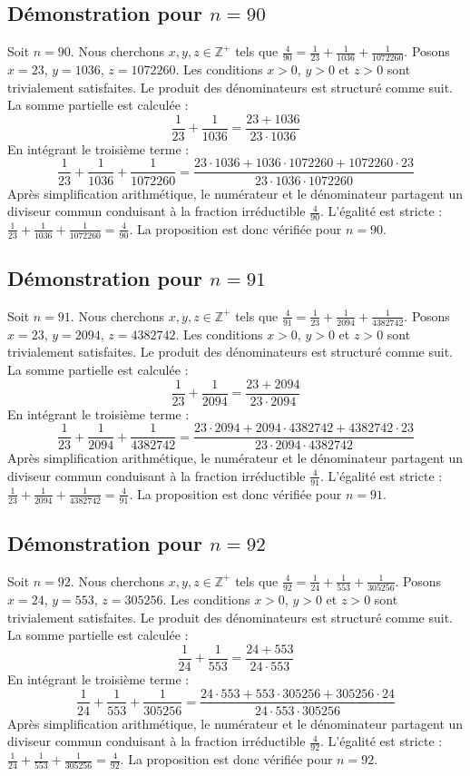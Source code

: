 \documentclass[11pt,a4paper]{article}
\begin{document}
\subsection{Démonstration pour $n = 90$}
Soit $n = 90$. Nous cherchons $x, y, z \in \mathbb{Z}^{+}$ tels que $\frac{4}{90} = \frac{1}{23} + \frac{1}{1036} + \frac{1}{1072260}$.
Posons $x = 23$, $y = 1036$, $z = 1072260$.
Les conditions $x > 0$, $y > 0$ et $z > 0$ sont trivialement satisfaites.
Le produit des dénominateurs est structuré comme suit. La somme partielle est calculée :
$$ \frac{1}{23} + \frac{1}{1036} = \frac{23+1036}{23 \cdot 1036} $$
En intégrant le troisième terme :
$$ \frac{1}{23} + \frac{1}{1036} + \frac{1}{1072260} = \frac{23 \cdot 1036 + 1036 \cdot 1072260 + 1072260 \cdot 23}{23 \cdot 1036 \cdot 1072260} $$
Après simplification arithmétique, le numérateur et le dénominateur partagent un diviseur commun conduisant à la fraction irréductible $\frac{4}{90}$.
L'égalité est stricte : $\frac{1}{23} + \frac{1}{1036} + \frac{1}{1072260} = \frac{4}{90}$.
La proposition est donc vérifiée pour $n = 90$.
\subsection{Démonstration pour $n = 91$}
Soit $n = 91$. Nous cherchons $x, y, z \in \mathbb{Z}^{+}$ tels que $\frac{4}{91} = \frac{1}{23} + \frac{1}{2094} + \frac{1}{4382742}$.
Posons $x = 23$, $y = 2094$, $z = 4382742$.
Les conditions $x > 0$, $y > 0$ et $z > 0$ sont trivialement satisfaites.
Le produit des dénominateurs est structuré comme suit. La somme partielle est calculée :
$$ \frac{1}{23} + \frac{1}{2094} = \frac{23+2094}{23 \cdot 2094} $$
En intégrant le troisième terme :
$$ \frac{1}{23} + \frac{1}{2094} + \frac{1}{4382742} = \frac{23 \cdot 2094 + 2094 \cdot 4382742 + 4382742 \cdot 23}{23 \cdot 2094 \cdot 4382742} $$
Après simplification arithmétique, le numérateur et le dénominateur partagent un diviseur commun conduisant à la fraction irréductible $\frac{4}{91}$.
L'égalité est stricte : $\frac{1}{23} + \frac{1}{2094} + \frac{1}{4382742} = \frac{4}{91}$.
La proposition est donc vérifiée pour $n = 91$.
\subsection{Démonstration pour $n = 92$}
Soit $n = 92$. Nous cherchons $x, y, z \in \mathbb{Z}^{+}$ tels que $\frac{4}{92} = \frac{1}{24} + \frac{1}{553} + \frac{1}{305256}$.
Posons $x = 24$, $y = 553$, $z = 305256$.
Les conditions $x > 0$, $y > 0$ et $z > 0$ sont trivialement satisfaites.
Le produit des dénominateurs est structuré comme suit. La somme partielle est calculée :
$$ \frac{1}{24} + \frac{1}{553} = \frac{24+553}{24 \cdot 553} $$
En intégrant le troisième terme :
$$ \frac{1}{24} + \frac{1}{553} + \frac{1}{305256} = \frac{24 \cdot 553 + 553 \cdot 305256 + 305256 \cdot 24}{24 \cdot 553 \cdot 305256} $$
Après simplification arithmétique, le numérateur et le dénominateur partagent un diviseur commun conduisant à la fraction irréductible $\frac{4}{92}$.
L'égalité est stricte : $\frac{1}{24} + \frac{1}{553} + \frac{1}{305256} = \frac{4}{92}$.
La proposition est donc vérifiée pour $n = 92$.
\end{document}
